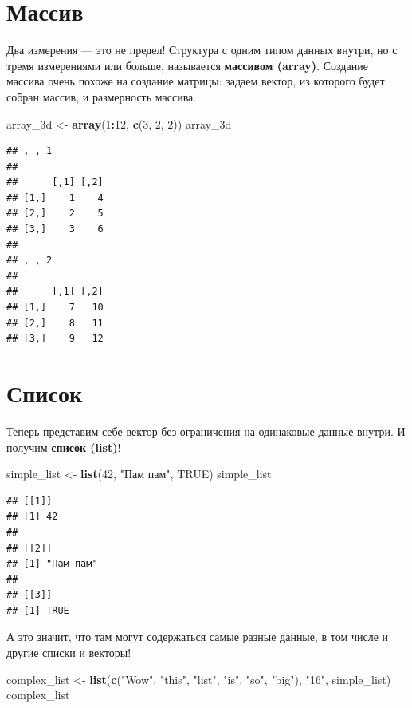 \documentclass[]{book}
\newenvironment{Shaded}{\begin{snugshade}}{\end{snugshade}}
\newcommand{\KeywordTok}[1]{\textcolor[rgb]{0.13,0.29,0.53}{\textbf{#1}}}
\newcommand{\DecValTok}[1]{\textcolor[rgb]{0.00,0.00,0.81}{#1}}
\newcommand{\StringTok}[1]{\textcolor[rgb]{0.31,0.60,0.02}{#1}}
\newcommand{\OtherTok}[1]{\textcolor[rgb]{0.56,0.35,0.01}{#1}}
\newcommand{\OperatorTok}[1]{\textcolor[rgb]{0.81,0.36,0.00}{\textbf{#1}}}
\newcommand{\NormalTok}[1]{#1}
\begin{document}
\section{Массив}\label{arrays}

Два измерения --- это не предел! Структура с одним типом данных внутри,
но с тремя измерениями или больше, называется \textbf{массивом (array)}.
Создание массива очень похоже на создание матрицы: задаем вектор, из
которого будет собран массив, и размерность массива.

\begin{Shaded}
\begin{Highlighting}[]
\NormalTok{array_3d <-}\StringTok{ }\KeywordTok{array}\NormalTok{(}\DecValTok{1}\OperatorTok{:}\DecValTok{12}\NormalTok{, }\KeywordTok{c}\NormalTok{(}\DecValTok{3}\NormalTok{, }\DecValTok{2}\NormalTok{, }\DecValTok{2}\NormalTok{))}
\NormalTok{array_3d}
\end{Highlighting}
\end{Shaded}

\begin{verbatim}
## , , 1
## 
##      [,1] [,2]
## [1,]    1    4
## [2,]    2    5
## [3,]    3    6
## 
## , , 2
## 
##      [,1] [,2]
## [1,]    7   10
## [2,]    8   11
## [3,]    9   12
\end{verbatim}

\section{Список}\label{list}

Теперь представим себе вектор без ограничения на одинаковые данные
внутри. И получим \textbf{список (list)}!

\begin{Shaded}
\begin{Highlighting}[]
\NormalTok{simple_list <-}\StringTok{ }\KeywordTok{list}\NormalTok{(}\DecValTok{42}\NormalTok{, }\StringTok{"Пам пам"}\NormalTok{, }\OtherTok{TRUE}\NormalTok{)}
\NormalTok{simple_list}
\end{Highlighting}
\end{Shaded}

\begin{verbatim}
## [[1]]
## [1] 42
## 
## [[2]]
## [1] "Пам пам"
## 
## [[3]]
## [1] TRUE
\end{verbatim}

А это значит, что там могут содержаться самые разные данные, в том числе
и другие списки и векторы!

\begin{Shaded}
\begin{Highlighting}[]
\NormalTok{complex_list <-}\StringTok{ }\KeywordTok{list}\NormalTok{(}\KeywordTok{c}\NormalTok{(}\StringTok{"Wow"}\NormalTok{, }\StringTok{"this"}\NormalTok{, }\StringTok{"list"}\NormalTok{, }\StringTok{"is"}\NormalTok{, }\StringTok{"so"}\NormalTok{, }\StringTok{"big"}\NormalTok{), }\StringTok{"16"}\NormalTok{, simple_list)}
\NormalTok{complex_list}
\end{Highlighting}
\end{Shaded}
\end{document}
